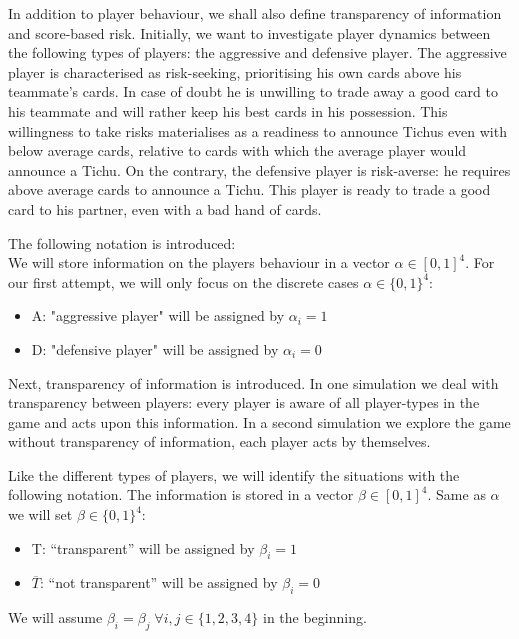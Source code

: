 In addition to player behaviour, we shall also define transparency of information and score-based risk. Initially, we want to investigate player dynamics between the following types of players: the aggressive and defensive player. The aggressive player is characterised as risk-seeking, prioritising his own cards above his teammate’s cards. In case of doubt he is unwilling to trade away a good card to his teammate and will rather keep his best cards in his possession. This willingness to take risks materialises as a readiness to announce Tichus even with below average cards, relative to cards with which the average player would announce a Tichu. On the contrary, the defensive player is risk-averse: he requires above average cards to announce a Tichu. This player is ready to trade a good card to his partner, even with a bad hand of cards.

The following notation is introduced: \\We will store information on the players behaviour in a vector $\alpha \in [0,1]^4$. For our first attempt, we will only focus on the discrete cases $\alpha \in \{0,1\}^4$:
\\ 
\begin{itemize}
\item A: "aggressive player" will be assigned by $\alpha_i = 1$
\item D: "defensive player" will be assigned by $\alpha_i = 0$ \\
\end{itemize} 

Next, transparency of information is introduced. In one simulation we deal with transparency between players: every player is aware of all player-types in the game and acts upon this information. In a second simulation we explore the game without transparency of information, each player acts by themselves.

Like the different types of players, we will identify the situations with the following notation. The information is stored in a vector $\beta \in [0,1]^4$. Same as $\alpha$ we will set $\beta \in \{0,1\}^4$:
\\ 
\begin{itemize}
\item T: “transparent” will be assigned by $\beta_i = 1$
\item $\overline{T}$: “not transparent” will be assigned by $\beta_i = 0$ \\
\end{itemize}

We will assume  $\beta_i = \beta_j\;\forall i, j\in \{1,2,3,4\}$ in the beginning. 

